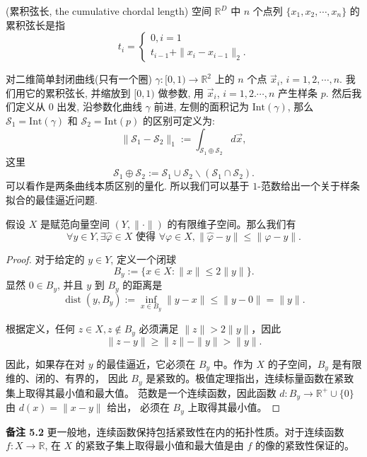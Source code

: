 \documentclass[a4paper]{ctexart}
\newcommand{\hl}[1]
{\noindent {\bf {#1}}}
\begin{document}
{\hl{定义 3.71} (累积弦长, the cumulative chordal length) 空间 $\mathbb{R}^D$ 中 $n$
个点列 $\{x_1, x_2, \cdots, x_n\}$ 的累积弦长是指  
$$
t_i = \left\{
\begin{array}{ll}
  0, i = 1\\
  t_{i - 1} + \|x_i - x_{i - 1}\|_2.
\end{array}
\right.
$$

\hl{例 5.5} 对二维简单封闭曲线(只有一个圈) $\gamma : [0, 1) \to \mathbb{R}^2$ 
上的 $n$ 个点 $\vec{x}_i$, $i = 1, 2, \cdots, n$. 我们用它的累积弦长, 并缩放到 $[0, 1)$ 做参数,
用 $\vec{x}_i$, $i = 1, 2. \cdots, n$ 产生样条 $p$. 然后我们定义从 $0$ 出发, 沿参数化曲线 $\gamma$ 前进, 
左侧的面积记为 $\mbox{Int}(\gamma)$, 那么 $\mathcal{S}_1 = \mbox{Int}(\gamma)$ 和 
$\mathcal{S}_2 = \mbox{Int}(p)$ 的区别可定义为: 
$$
\|\mathcal{S}_1 - \mathcal{S}_2\|_1 := \int_{\mathcal{S}_1 \oplus \mathcal{S}_2} d\vec{x},
$$
这里 
$$
\mathcal{S}_1 \oplus \mathcal{S}_2 := \mathcal{S}_1 \cup \mathcal{S}_2 \backslash (\mathcal{S}_1 \cap \mathcal{S}_2).
$$
可以看作是两条曲线本质区别的量化. 所以我们可以基于 $1$-范数给出一个关于样条拟合的最佳逼近问题.

\hl{定理 5.6} 假设 \( X \) 是赋范向量空间 \( (Y, \|\cdot\|) \) 的有限维子空间。那么我们有
\[
  \forall y \in Y, \exists \hat{\varphi} \in X \text{ 使得 } \forall \varphi \in X, \|\hat{\varphi} - y\| \leq \|\varphi - y\|. \tag{5.5}
\]

\begin{proof}
对于给定的 \( y \in Y \), 定义一个闭球
\[
  B_{y} := \{x \in X : \|x\| \leq 2\|y\|\}.
\]
显然 \( 0 \in B_{y} \), 并且 \( y \) 到 \( B_{y} \) 的距离是
\[
  \operatorname{dist}(y, B_{y}) := \inf_{x \in B_{y}} \|y - x\| \leq \|y - 0\| = \|y\|.
\]
  
根据定义，任何 \( z \in X, z \notin B_{y} \) 必须满足 \( \|z\| > 2\|y\| \)，因此
\[
  \|z - y\| \geq \|z\| - \|y\| > \|y\|.
\]
  
因此，如果存在对 \( y \) 的最佳逼近，它必须在 \( B_{y} \) 中。作为 \( X \) 的子空间，\( B_{y} \) 是有限维的、闭的、有界的，
因此 \( B_{y} \) 是紧致的。极值定理指出，连续标量函数在紧致集上取得其最小值和最大值。
范数是一个连续函数，因此函数 \( d: B_{y} \rightarrow \mathbb{R}^{+} \cup \{0\} \) 由 \( d(x) = \|x - y\| \) 给出，
必须在 \( B_{y} \) 上取得其最小值。
\end{proof}

\noindent \textbf{备注 5.2} 更一般地，连续函数保持包括紧致性在内的拓扑性质。对于连续函数 \( f: X \rightarrow \mathbb{R} \), 
在 \( X \) 的紧致子集上取得最小值和最大值是由 \( f \) 的像的紧致性保证的。

}
\end{document}
